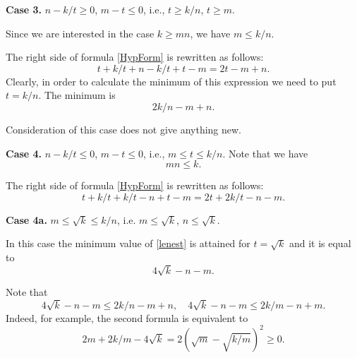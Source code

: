 \documentclass[11pt]{article}
\theoremstyle{Mystyle}
\begin{document}
\textbf{Case 3.} $n-k/t\geq 0$, $m-t\leq0$, i.e., $t\geq k/n$, $t\geq m$.

Since we are interested in the case $k\geq mn$, we have $m\leq k/n$.

The right side of formula \eqref{HypForm} is rewritten as follows:
$$t + k/t + n-k/t + t-m = 2t - m + n.$$
Clearly, in order to calculate the minimum of this expression we need to put $t = k/n$. The minimum is
$$2k/n - m + n.$$

Consideration of this case does not give anything new.

\textbf{Case 4.} $n-k/t\leq 0$, $m-t\leq 0$, i.e., $m\leq t\leq k/n$. Note that we have
$$mn\leq k.$$

The right side of formula \eqref{HypForm} is rewritten as follows:
\begin{equation}
\label{lenest}
t + k/t + k/t - n + t - m = 2t + 2k/t - n - m.
\end{equation}

\textbf{Case 4a.} $m\leq \sqrt{k}\leq k/n$, i.e. $m\leq \sqrt{k}$, $n\leq \sqrt{k}$.

In this case the minimum value of \eqref{lenest} is attained for $t=\sqrt{k}$ and it is equal to 
$$4\sqrt{k} - n - m.$$

Note that 
$$4\sqrt{k} - n - m\leq 2k/n - m + n,\quad 4\sqrt{k} - n - m\leq 2k/m - n + m.$$
Indeed, for example, the second formula is equivalent to
$$2m + 2k/m - 4\sqrt{k} = 2(\sqrt{m} - \sqrt{k/m})^2\geq 0.$$
\end{document}
